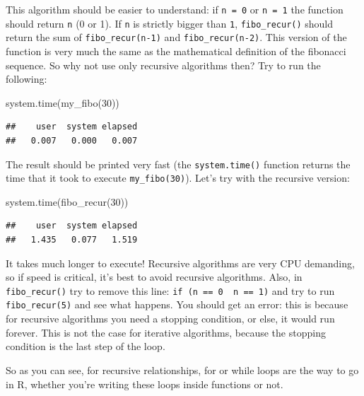 \documentclass[
]{article}
\newenvironment{Shaded}{\begin{snugshade}}{\end{snugshade}}
\newcommand{\DecValTok}[1]{\textcolor[rgb]{0.00,0.00,0.81}{#1}}
\newcommand{\FunctionTok}[1]{\textcolor[rgb]{0.00,0.00,0.00}{#1}}
\newcommand{\NormalTok}[1]{#1}
\begin{document}
This algorithm should be easier to understand: if \texttt{n\ =\ 0} or \texttt{n\ =\ 1} the function should return \texttt{n}
(0 or 1). If \texttt{n} is strictly bigger than \texttt{1}, \texttt{fibo\_recur()} should return the sum of
\texttt{fibo\_recur(n-1)} and \texttt{fibo\_recur(n-2)}. This version of the function is very much the same as the
mathematical definition of the fibonacci sequence. So why not use only recursive algorithms
then? Try to run the following:

\begin{Shaded}
\begin{Highlighting}[]
\FunctionTok{system.time}\NormalTok{(}\FunctionTok{my\_fibo}\NormalTok{(}\DecValTok{30}\NormalTok{))}
\end{Highlighting}
\end{Shaded}

\begin{verbatim}
##    user  system elapsed 
##   0.007   0.000   0.007
\end{verbatim}

The result should be printed very fast (the \texttt{system.time()} function returns the time that it took
to execute \texttt{my\_fibo(30)}). Let's try with the recursive version:

\begin{Shaded}
\begin{Highlighting}[]
\FunctionTok{system.time}\NormalTok{(}\FunctionTok{fibo\_recur}\NormalTok{(}\DecValTok{30}\NormalTok{))}
\end{Highlighting}
\end{Shaded}

\begin{verbatim}
##    user  system elapsed 
##   1.435   0.077   1.519
\end{verbatim}

It takes much longer to execute! Recursive algorithms are very CPU demanding, so if speed is
critical, it's best to avoid recursive algorithms. Also, in \texttt{fibo\_recur()} try to remove this line:
\texttt{if\ (n\ ==\ 0\ \textbar{}\textbar{}\ n\ ==\ 1)} and try to run \texttt{fibo\_recur(5)} and see what happens. You should
get an error: this is because for recursive algorithms you need a stopping condition, or else,
it would run forever. This is not the case for iterative algorithms, because the stopping
condition is the last step of the loop.

So as you can see, for recursive relationships, for or while loops are the way to go in R, whether
you're writing these loops inside functions or not.
\end{document}
